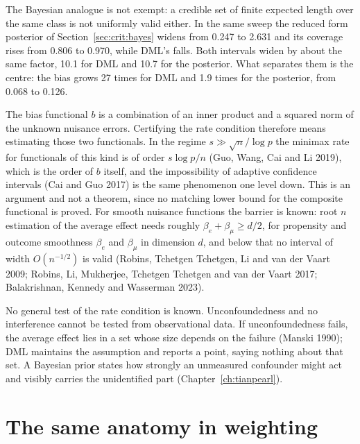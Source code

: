 The Bayesian analogue is not exempt: a credible set of finite expected length over the same class is not uniformly valid either. In the same sweep the reduced form posterior of Section~\ref{sec:crit:bayes} widens from 0.247 to 2.631 and its coverage rises from 0.806 to 0.970, while DML's falls. Both intervals widen by about the same factor, 10.1 for DML and 10.7 for the posterior. What separates them is the centre: the bias grows 27 times for DML and 1.9 times for the posterior, from 0.068 to 0.126.

\begin{remark}[No certificate]\label{crit:rem:cert}
The bias functional $b$ is a combination of an inner product and a squared norm of the unknown nuisance errors. Certifying the rate condition therefore means estimating those two functionals. In the regime $s \gg \sqrt n/\log p$ the minimax rate for functionals of this kind is of order $s\log p/n$ (Guo, Wang, Cai and Li 2019), which is the order of $b$ itself, and the impossibility of adaptive confidence intervals (Cai and Guo 2017) is the same phenomenon one level down. This is an argument and not a theorem, since no matching lower bound for the composite functional is proved. For smooth nuisance functions the barrier is known: root $n$ estimation of the average effect needs roughly $\beta_e + \beta_\mu \ge d/2$, for propensity and outcome smoothness $\beta_e$ and $\beta_\mu$ in dimension $d$, and below that no interval of width $O(n^{-1/2})$ is valid (Robins, Tchetgen Tchetgen, Li and van der Vaart 2009; Robins, Li, Mukherjee, Tchetgen Tchetgen and van der Vaart 2017; Balakrishnan, Kennedy and Wasserman 2023).
\end{remark}

No general test of the rate condition is known. Unconfoundedness and no interference cannot be tested from observational data. If unconfoundedness fails, the average effect lies in a set whose size depends on the failure (Manski 1990); DML maintains the assumption and reports a point, saying nothing about that set. A Bayesian prior states how strongly an unmeasured confounder might act and visibly carries the unidentified part (Chapter~\ref{ch:tianpearl}).

\section{The same anatomy in weighting}\label{sec:crit:weights}

